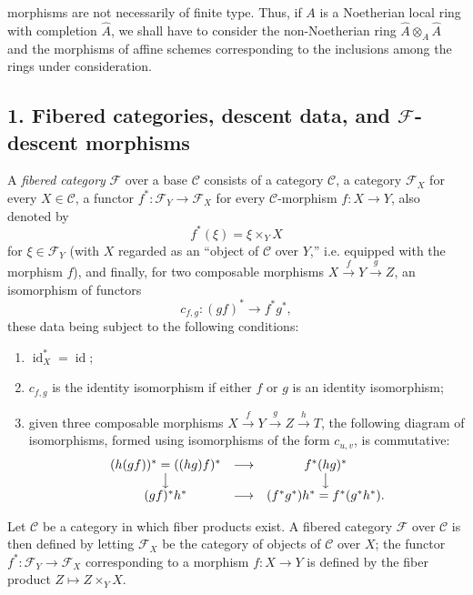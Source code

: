 morphisms are not necessarily of finite type. Thus, if $A$ is a Noetherian
local ring with completion $\widehat A$, we shall have to consider the
non-Noetherian ring $\widehat A\otimes_A\widehat A$ and the morphisms of affine
schemes corresponding to the inclusions among the rings under consideration.


\subsection*{1. Fibered categories, descent data, and
$\mathcal F$-descent morphisms}

 A \emph{fibered category} $\mathcal F$ over a base
$\mathcal C$ consists of a category $\mathcal C$, a category $\mathcal F_X$
for every $X\in\mathcal C$, a functor
$f^*:\mathcal F_Y\longrightarrow\mathcal F_X$ for every
$\mathcal C$-morphism $f:X\longrightarrow Y$, also denoted by
\[
  f^*(\xi)=\xi\times_Y X
\]
for $\xi\in\mathcal F_Y$ (with $X$ regarded as an “object of $\mathcal C$
over $Y$,” i.e. equipped with the morphism $f$), and finally, for two
composable morphisms $X\xrightarrow{f}Y\xrightarrow{g}Z$, an isomorphism of
functors
\[
  c_{f,g}:(gf)^*\longrightarrow f^*g^*,
\]
these data being subject to the following conditions:

\begin{enumerate}
\item[(i)] $\operatorname{id}_X^*=\operatorname{id}$;
\item[(ii)] $c_{f,g}$ is the identity isomorphism if either $f$ or $g$ is an
identity isomorphism;
\item[(iii)] given three composable morphisms
$X\xrightarrow{f}Y\xrightarrow{g}Z\xrightarrow{h}T$, the following diagram of
isomorphisms, formed using isomorphisms of the form $c_{u,v}$, is commutative:
\[
\begin{array}{ccc}
  (h(gf))^*=((hg)f)^* & \longrightarrow & f^*(hg)^* \\
  \big\downarrow && \big\downarrow \\
  (gf)^*h^* & \longrightarrow & (f^*g^*)h^*=f^*(g^*h^*).
\end{array}
\]
\end{enumerate}

 Let $\mathcal C$ be a category in which fiber products
exist. A fibered category $\mathcal F$ over $\mathcal C$ is then defined by
letting $\mathcal F_X$ be the category of objects of $\mathcal C$ over $X$;
the functor $f^*:\mathcal F_Y\longrightarrow\mathcal F_X$ corresponding to a
morphism $f:X\longrightarrow Y$ is defined by the fiber product
$Z\longmapsto Z\times_YX$.

